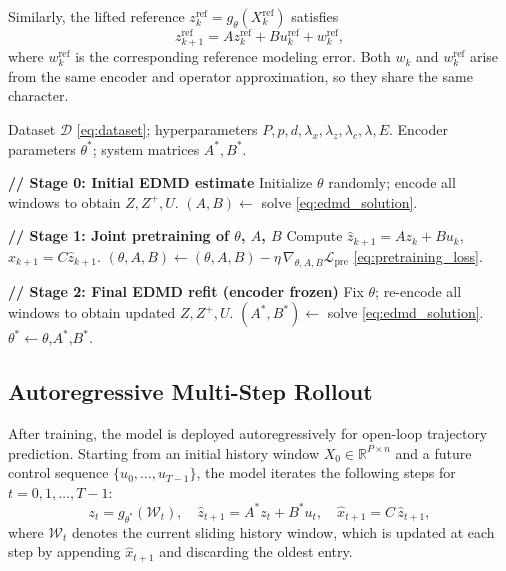 \documentclass[journal]{IEEEtran}
\begin{document}
Similarly, the lifted reference $z_k^{\mathrm{ref}} = g_\theta(X_k^{\mathrm{ref}})$ satisfies
\begin{equation}
    z_{k+1}^{\mathrm{ref}} = Az_k^{\mathrm{ref}} + Bu_k^{\mathrm{ref}} + w_k^{\mathrm{ref}},
    \label{eq:ref_error}
\end{equation}
where $w_k^{\mathrm{ref}}$ is the corresponding reference modeling error. Both $w_k$ and $w_k^{\mathrm{ref}}$ arise from the same encoder and operator approximation, so they share the same character.

\begin{algorithm}[!t]
\caption{Transformer-Koopman Training Pipeline}
\label{alg:training}
\begin{algorithmic}[1]
\REQUIRE Dataset $\mathcal{D}$ \eqref{eq:dataset}; hyperparameters $P,p,d,\lambda_x,\lambda_z,\lambda_c,\lambda,E$.
\ENSURE Encoder parameters $\theta^{*}$; system matrices $A^{*},B^{*}$.

\STATE \textbf{// Stage 0: Initial EDMD estimate}
\STATE Initialize $\theta$ randomly; encode all windows to obtain $Z,Z^{+},U$.
\STATE $(A,B)\leftarrow$ solve \eqref{eq:edmd_solution}. \hfill{}

\STATE \textbf{// Stage 1: Joint pretraining of $\theta$, $A$, $B$}
        \STATE Compute $\hat{z}_{k+1}=Az_k+Bu_k$,\; $\hat{x}_{k+1}=C\hat{z}_{k+1}$.
        \STATE $(\theta,A,B)\leftarrow(\theta,A,B) - \eta\,\nabla_{\theta,A,B}\mathcal{L}_{\mathrm{pre}}$ \eqref{eq:pretraining_loss}.
    \ENDFOR
\ENDFOR

\STATE \textbf{// Stage 2: Final EDMD refit (encoder frozen)}
\STATE Fix $\theta$; re-encode all windows to obtain updated $Z,Z^{+},U$.
\STATE $(A^{*},B^{*})\leftarrow$ solve \eqref{eq:edmd_solution}.
\RETURN $\theta^{*}\leftarrow\theta$,\;$A^{*}$,\;$B^{*}$.
\end{algorithmic}
\end{algorithm}

\subsection{Autoregressive Multi-Step Rollout}
\label{sec:rollout}

After training, the model is deployed autoregressively for open-loop trajectory prediction. Starting from an initial history window $X_0 \in \mathbb{R}^{P \times n}$ and a future control sequence $\{u_0,\ldots,u_{T-1}\}$, the model iterates the following steps for $t=0,1,\ldots,T-1$:
\begin{equation}
    z_t = g_{\theta^*}(\mathcal{W}_t), \quad
    \hat{z}_{t+1} = A^* z_t + B^* u_t, \quad
    \hat{x}_{t+1} = C\,\hat{z}_{t+1},
    \label{eq:rollout_step}
\end{equation}
where $\mathcal{W}_t$ denotes the current sliding history window, which is updated at each step by appending $\hat{x}_{t+1}$ and discarding the oldest entry.
\end{document}
